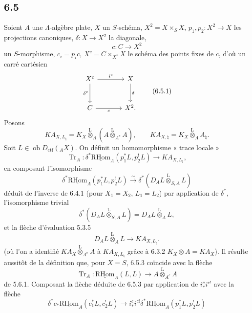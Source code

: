 \documentclass[11pt]{article}
\providecommand{\RHom}{\mathrm{RHom}}
\providecommand{\uRHom}{\underline{\RHom}}
\providecommand{\Tr}{\operatorname{Tr}}
\providecommand{\Tr}{\operatorname{Tr}}
\providecommand{\lten}{\overset{\mathrm L}{\otimes}}
\providecommand{\Ob}{\operatorname{ob}}
\providecommand{\Tr}{\operatorname{Tr}}
\providecommand{\RHom}{\mathrm{RHom}}
\providecommand{\lten}{\overset{\mathrm L}{\otimes}}
\providecommand{\RHom}{\mathrm R\mathcal{H}om}
\providecommand{\lten}{\overset{\mathrm L}{\otimes}}
\providecommand{\Ob}{\operatorname{ob}}
\providecommand{\Tr}{\operatorname{Tr}}
\providecommand{\lten}{\overset{\mathrm L}{\otimes}}
\providecommand{\lten}{\overset{\mathrm L}{\otimes}}
\providecommand{\Ob}{\operatorname{Ob}}
\providecommand{\lten}{\overset{\mathrm L}{\otimes}}
\providecommand{\RHom}{\mathrm{RHom}}
\providecommand{\Tr}{\operatorname{Tr}}
\providecommand{\Ob}{\operatorname{ob}}
\providecommand{\Ob}{\operatorname{Ob}}
\providecommand{\lten}{\overset{\mathrm L}{\otimes}}
\begin{document}
\subsection*{6.5}
Soient $A$ une $\Lambda$-algèbre plate, $X$ un $S$-schéma, $X^2=X\times_SX$, $p_1,p_2:X^2\to X$ les projections canoniques, $\delta:X\to X^2$ la diagonale,
\[
c:C\longrightarrow X^2
\]
un $S$-morphisme, $c_i=p_ic$, $X^c=C\times_{X^2}X$ le schéma des points fixes de $c$, d'où un carré cartésien
\begin{equation}
\begin{tikzcd}[column sep=large,row sep=large]
X^c \arrow[r,"i^c"] \arrow[d,"\delta^c"'] & X \arrow[d,"\delta"]\\
C \arrow[r,"c"'] & X^2 .
\end{tikzcd}
\tag{6.5.1}
\end{equation}
Posons
\begin{equation}
KA_{X,L_{\natural}}=K_X\lten_{\Lambda}(A\lten_{A^e}A),
\qquad
KA_{X,\natural}=K_X\lten_{\Lambda}A_{\natural}.
\tag{6.5.2}
\end{equation}
Soit $L\in\Ob D_{\mathrm{ctf}}({}_AX)$. On définit un homomorphisme « trace locale »
\begin{equation}
\Tr_A:\delta^*\uRHom_A(p_1^*L,p_2^!L)
\longrightarrow
KA_{X,L_{\natural}},
\tag{6.5.3}
\end{equation}
en composant l'isomorphisme
\begin{equation}
\delta^*\uRHom_A(p_1^*L,p_2^!L)
\xrightarrow{\sim}
\delta^*(D_AL\lten_{S,A}L)
\tag{6.5.4}
\end{equation}
déduit de l'inverse de 6.4.1 (pour $X_1=X_2$, $L_1=L_2$) par application de $\delta^*$, l'isomorphisme trivial
\begin{equation}
\delta^*(D_AL\lten_{S,A}L)=D_AL\lten_AL,
\tag{6.5.5}
\end{equation}
et la flèche d'évaluation 5.3.5
\begin{equation}
D_AL\lten_AL\longrightarrow KA_{X,L_{\natural}}.
\tag{6.5.6}
\end{equation}
(où l'on a identifié $KA_X\lten_{A^e}A$ à $KA_{X,L_{\natural}}$ grâce à 6.3.2 $K_X\otimes A=KA_X$). Il résulte aussitôt de la définition que, pour $X=S$, 6.5.3 coïncide avec la flèche
\[
\Tr_A:\uRHom_A(L,L)\longrightarrow A\lten_{A^e}A
\]
de 5.6.1. Composant la flèche déduite de 6.5.3 par application de $i_*^ci^{c!}$ avec la flèche
\begin{equation}
\delta^*c_*\uRHom_A(c_1^*L,c_2^!L)
\longrightarrow
i_*^ci^{c!}\delta^*\uRHom_A(p_1^*L,p_2^!L)
\tag{6.5.7}
\end{equation}
\end{document}
